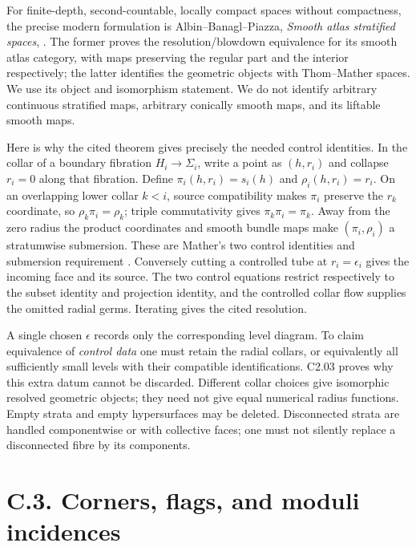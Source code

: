 For finite-depth, second-countable, locally compact spaces without compactness, the precise modern formulation is Albin--Banagl--Piazza, \emph{Smooth atlas stratified spaces}, \cite[Theorems 2.10 and 2.13, pp.24--28]{C_ABP}. The former proves the resolution/blowdown equivalence for its smooth atlas category, with maps preserving the regular part and the interior respectively; the latter identifies the geometric objects with Thom--Mather spaces. We use its object and isomorphism statement. We do not identify arbitrary continuous stratified maps, arbitrary conically smooth maps, and its liftable smooth maps.

Here is why the cited theorem gives precisely the needed control identities. In the collar of a boundary fibration \(H_i\to\Sigma_i\), write a point as \((h,r_i)\) and collapse \(r_i=0\) along that fibration. Define \(\pi_i(h,r_i)=s_i(h)\) and \(\rho_i(h,r_i)=r_i\). On an overlapping lower collar \(k<i\), source compatibility makes \(\pi_i\) preserve the \(r_k\) coordinate, so \(\rho_k\pi_i=\rho_k\); triple commutativity gives \(\pi_k\pi_i=\pi_k\). Away from the zero radius the product coordinates and smooth bundle maps make \((\pi_i,\rho_i)\) a stratumwise submersion. These are Mather's two control identities and submersion requirement \cite[section 7, p.15]{C_Mather}. Conversely cutting a controlled tube at \(r_i=\epsilon_i\) gives the incoming face and its source. The two control equations restrict respectively to the subset identity and projection identity, and the controlled collar flow supplies the omitted radial germs. Iterating gives the cited resolution.

A single chosen \(\epsilon\) records only the corresponding level diagram. To claim equivalence of \emph{control data} one must retain the radial collars, or equivalently all sufficiently small levels with their compatible identifications. C2.03 proves why this extra datum cannot be discarded. Different collar choices give isomorphic resolved geometric objects; they need not give equal numerical radius functions. Empty strata and empty hypersurfaces may be deleted. Disconnected strata are handled componentwise or with collective faces; one must not silently replace a disconnected fibre by its components.

\section{C.3. Corners, flags, and moduli incidences}\label{c.3.-corners-flags-and-moduli-incidences}

